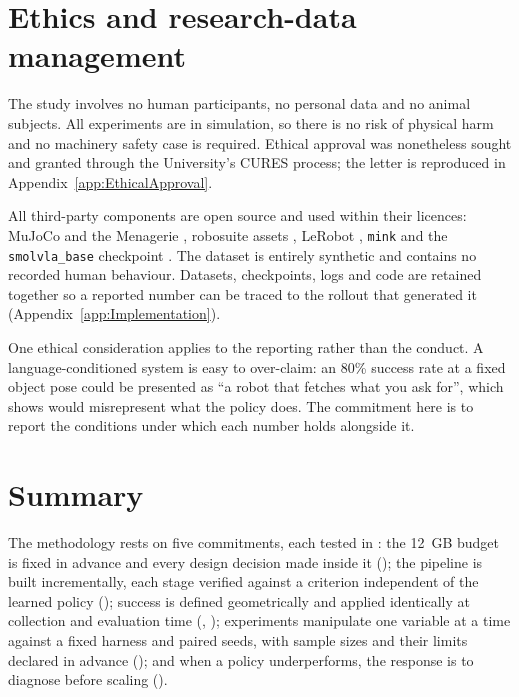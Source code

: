 \section{Ethics and research-data management}
\label{sec:m-ethics}
The study involves no human participants, no personal data and no animal subjects. All
experiments are in simulation, so there is no risk of physical harm and no machinery
safety case is required. Ethical approval was nonetheless sought and granted through
the University's CURES process; the letter is reproduced in
Appendix~\ref{app:EthicalApproval}.

All third-party components are open source and used within their licences: MuJoCo and
the Menagerie \parencite{todorov2012mujoco, deepmind2022menagerie}, robosuite assets
\parencite{zhu2020robosuite}, LeRobot \parencite{cadene2024lerobot}, \texttt{mink}
\parencite{zakka2024mink} and the \texttt{smolvla\_base} checkpoint
\parencite{shukor2025smolvla}. The dataset is entirely synthetic and contains no
recorded human behaviour. Datasets, checkpoints, logs and code are retained together so
a reported number can be traced to the rollout that generated it
(Appendix~\ref{app:Implementation}).

One ethical consideration applies to the reporting rather than the conduct. A
language-conditioned system is easy to over-claim: an 80\% success rate at a fixed
object pose could be presented as ``a robot that fetches what you ask for'', which
 shows would misrepresent what the policy does. The commitment
here is to report the conditions under which each number holds alongside it.

\section{Summary}
\label{sec:m-summary}
The methodology rests on five commitments, each tested in : the
\SI{12}{GB} budget is fixed in advance and every design decision made inside it
(); the pipeline is built incrementally, each stage verified against
a criterion independent of the learned policy (); success is defined
geometrically and applied identically at collection and evaluation time
(, ); experiments manipulate one variable at a
time against a fixed harness and paired seeds, with sample sizes and their limits
declared in advance (); and when a policy underperforms, the
response is to diagnose before scaling ().
